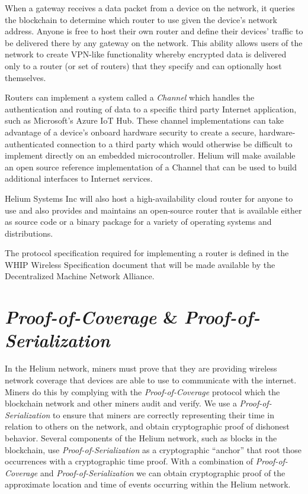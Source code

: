 \documentclass[UTF8, 10pt, nonatbib, nocopyrightspace, reprint]{sigplanconf}
\begin{document}
When a gateway receives a data packet from a device on the network, it queries the blockchain to determine which router to use given the device's network address. Anyone is free to host their own router and define their devices' traffic to be delivered there by any gateway on the network. This ability allows users of the network to create VPN-like functionality whereby encrypted data is delivered only to a router (or set of routers) that they specify and can optionally host themselves.

Routers can implement a system called a \emph{Channel} which handles the authentication and routing of data to a specific third party Internet application, such as Microsoft's Azure IoT Hub. These channel implementations can take advantage of a device's onboard hardware security to create a secure, hardware-authenticated connection to a third party which would otherwise be difficult to implement directly on an embedded microcontroller. Helium will make available an open source reference implementation of a Channel that can be used to build additional interfaces to Internet services.

Helium Systems Inc will also host a high-availability cloud router for anyone to use and also provides and maintains an open-source router that is available either as source code or a binary package for a variety of operating systems and distributions.

The protocol specification required for implementing a router is defined in the WHIP Wireless Specification document that will be made available by the Decentralized Machine Network Alliance.

\section{\emph{Proof-of-Coverage} \& \emph{Proof-of-Serialization}}\label{poc}

In the Helium network, miners must prove that they are providing wireless network coverage that devices are able to use to communicate with the internet. Miners do this by complying with the \emph{Proof-of-Coverage} protocol which the blockchain network and other miners audit and verify. We use a \emph{Proof-of-Serialization} to ensure that miners are correctly representing their time in relation to others on the network, and obtain cryptographic proof of dishonest behavior. Several components of the Helium network, such as blocks in the blockchain, use \emph{Proof-of-Serialization} as a cryptographic ``anchor'' that root those occurrences  with a cryptographic time proof. With a combination of \emph{Proof-of-Coverage} and \emph{Proof-of-Serialization} we can obtain cryptographic proof of the approximate location and time of events occurring within the Helium network.
\end{document}
